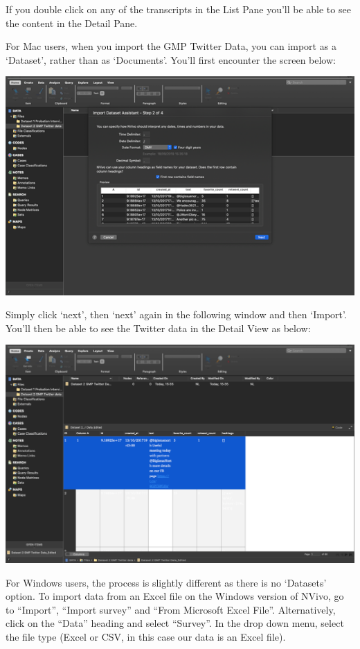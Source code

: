 \documentclass[
]{book}
\begin{document}
If you double click on any of the transcripts in the List Pane you'll be able to see the content in the Detail Pane.

For Mac users, when you import the GMP Twitter Data, you can import as a `Dataset', rather than as `Documents'. You'll first encounter the screen below:

\includegraphics{imgs/dataset_asistant.png}

Simply click `next', then `next' again in the following window and then `Import'. You'll then be able to see the Twitter data in the Detail View as below:

\includegraphics{imgs/twitter_nvivo.png}

For Windows users, the process is slightly different as there is no `Datasets' option. To import data from an Excel file on the Windows version of NVivo, go to ``Import'', ``Import survey'' and ``From Microsoft Excel File''. Alternatively, click on the ``Data'' heading and select ``Survey''. In the drop down menu, select the file type (Excel or CSV, in this case our data is an Excel file).
\end{document}
